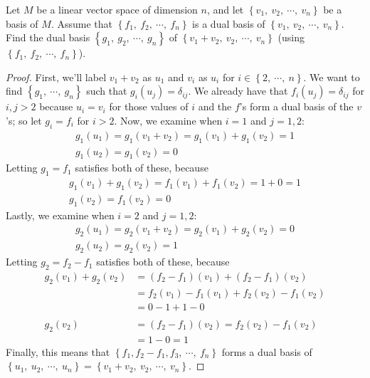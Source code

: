 \documentclass{article}
\newcommand{\bracks}[1]{\left\{#1\right\}}
\begin{document}
    \item Let $M$ be a linear vector space of dimension $n$, and let 
    $\bracks{v_1,\ v_2,\ \cdots,\ v_n}$ be a basis of $M$. Assume that 
    $\bracks{f_1,\ f_2,\ \cdots,\ f_n}$ is a dual basis of 
    $\bracks{v_1,\ v_2,\ \cdots,\ v_n}$. Find the dual basis
    $\bracks{g_1,\ g_2,\ \cdots,\ g_n}$ of 
    $\bracks{v_1+v_2,\ v_2,\ \cdots,\ v_n}$ (using $\bracks{f_1,\ f_2,\ 
    \cdots,\ f_n}$).
    \begin{proof}
    First, we'll label $v_1 + v_2$ as $u_1$ and $v_i$ as $u_i$ for $i \in 
    \bracks{2,\ \cdots,\ n}$.
    We want to find $\bracks{g_1,\ \cdots,\ g_n}$ such that $g_i(u_j) = 
    \delta_{ij}$. We already have that $f_i(u_j) = \delta_{ij}$ 
    for $i,j > 2$ because $u_i = v_i$ for those values of $i$ and the 
    $f$'s form a dual basis of the $v$'s; so let $g_i = f_i$ for $i > 2$. 
    Now, we examine when $i = 1$ and $j=1,2$:
    \begin{gather*}
    g_1(u_1) = g_1(v_1+v_2) = g_1(v_1) + g_1(v_2) = 1 \\
    g_1(u_2) = g_1(v_2) = 0
    \end{gather*}
    Letting $g_1 = f_1$ satisfies both of these, because
    \begin{gather*}
    g_1(v_1) + g_1(v_2) = f_1(v_1) + f_1(v_2) = 1 + 0 = 1 \\
    g_1(v_2) = f_1(v_2) = 0
    \end{gather*}
    Lastly, we examine when $i = 2$ and $j = 1,2$:
    \begin{gather*}
    g_2(u_1) = g_2(v_1 + v_2) = g_2(v_1) + g_2(v_2) = 0 \\
    g_2(u_2) = g_2(v_2) = 1
    \end{gather*}
    Letting $g_2 = f_2 - f_1$ satisfies both of these, because
    \begin{align*}
    g_2(v_1) + g_2(v_2) &= (f_2 - f_1)(v_1) + (f_2 - f_1)(v_2) \\
    &= f_2(v_1) - f_1(v_1) + f_2(v_2) - f_1(v_2) \\
    &= 0 - 1 + 1 - 0\\\\
    g_2(v_2) &= (f_2 - f_1)(v_2) = f_2(v_2) - f_1(v_2) \\
    &= 1 - 0 = 1
    \end{align*}
    Finally, this means that $\bracks{f_1, f_2- f_1, f_3,\ \cdots,\ f_n}$ 
    forms a dual basis of $\bracks{u_1,\ u_2,\ \cdots,\ u_n} = 
    \bracks{v_1+v_2,\ v_2,\ \cdots,\ v_n}$.
    \end{proof}
\end{document}
